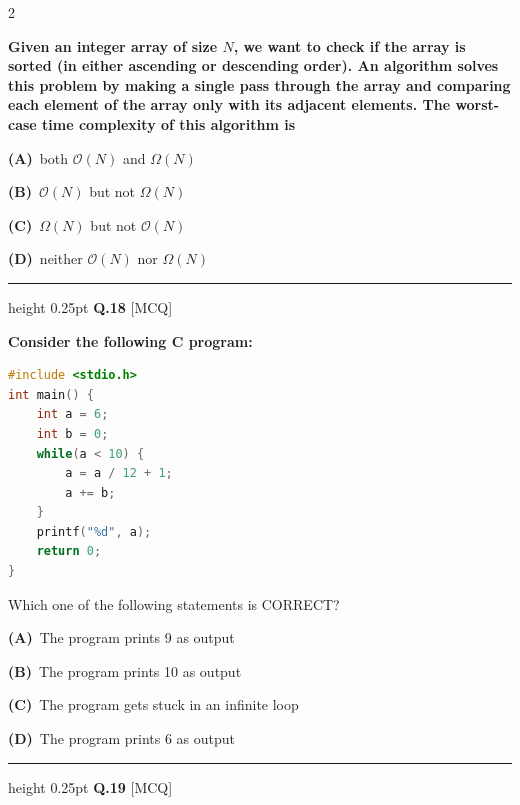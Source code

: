 \documentclass[a4paper,10pt,twoside]{article}
\begin{document}
\begin{multicols}{2}
{\bfseries Given an integer array of size $N$, we want to check if the array is sorted (in either ascending or descending order). An algorithm solves this problem by making a single pass through the array and comparing each element of the array only with its adjacent elements. The worst-case time complexity of this algorithm is \par}
\par\vspace{2pt}\noindent
\textbf{(A)}~both $\mathcal{O}(N)$ and $\Omega(N)$\par\vspace{2pt}\noindent
\textbf{(B)}~$\mathcal{O}(N)$ but not $\Omega(N)$\par\vspace{2pt}\noindent
\textbf{(C)}~$\Omega(N)$ but not $\mathcal{O}(N)$\par\vspace{2pt}\noindent
\textbf{(D)}~neither $\mathcal{O}(N)$ nor $\Omega(N)$
\par\vspace{6pt}\hrule height 0.25pt\vspace{6pt}
\noindent\textbf{Q.18} \hfill {\footnotesize\textsf{[MCQ]}}
\par\vspace{2pt}
{\bfseries Consider the following C program:
\begin{lstlisting}[language=C]
#include <stdio.h>
int main() {
    int a = 6;
    int b = 0;
    while(a < 10) {
        a = a / 12 + 1;
        a += b;
    }
    printf("%d", a);
    return 0;
}
\end{lstlisting}
Which one of the following statements is CORRECT? \par}
\par\vspace{2pt}\noindent
\textbf{(A)}~The program prints 9 as output\par\vspace{2pt}\noindent
\textbf{(B)}~The program prints 10 as output\par\vspace{2pt}\noindent
\textbf{(C)}~The program gets stuck in an infinite loop\par\vspace{2pt}\noindent
\textbf{(D)}~The program prints 6 as output
\par\vspace{6pt}\hrule height 0.25pt\vspace{6pt}
\noindent\textbf{Q.19} \hfill {\footnotesize\textsf{[MCQ]}}

\end{multicols}
\end{document}
